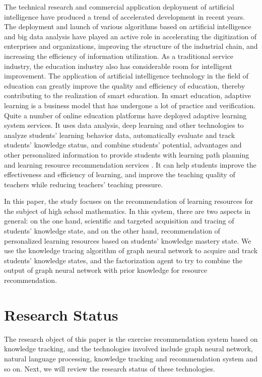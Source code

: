 The technical research and commercial application deployment of artificial intelligence have produced a trend of accelerated development in recent years. The deployment and launch of various algorithms based on artificial intelligence and big data analysis have played an active role in accelerating the digitization of enterprises and organizations, improving the structure of the industrial chain, and increasing the efficiency of information utilization. As a traditional service industry, the education industry also has considerable room for intelligent improvement. The application of artificial intelligence technology in the field of education can greatly improve the quality and efficiency of education, thereby contributing to the realization of smart education. In smart education, adaptive learning is a business model that has undergone a lot of practice and verification. Quite a number of online education platforms have deployed adaptive learning system services. It uses data analysis, deep learning and other technologies to analyze students' learning behavior data, automatically evaluate and track students' knowledge status, and combine students' potential, advantages and other personalized information to provide students with learning path planning and learning resource recommendation services . It can help students improve the effectiveness and efficiency of learning, and improve the teaching quality of teachers while reducing teachers' teaching pressure.

In this paper, the study focuses on the recommendation of learning resources for the subject of high school mathematics. In this system, there are two aspects in general: on the one hand, scientific and targeted acquisition and tracing of students' knowledge state, and on the other hand, recommendation of personalized learning resources based on students' knowledge mastery state. We use the knowledge tracing algorithm of graph neural network to acquire and track students' knowledge states, and the factorization agent to try to combine the output of graph neural network with prior knowledge for resource recommendation.


\section{Research Status} %

The research object of this paper is the exercise recommendation system based on knowledge tracking, and the technologies involved include graph neural network, natural language processing, knowledge tracking and recommendation system and so on. Next, we will review the research status of these technologies.


